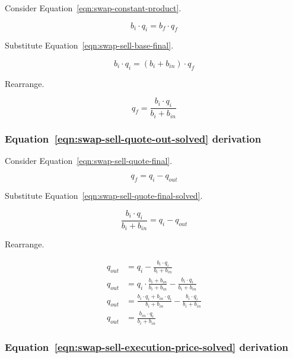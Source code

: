 \documentclass[table, twocolumn]{article}
\begin{document}
Consider Equation~\ref{eqn:swap-constant-product}.

\begin{equation}
	b_i \cdot q_i = b_f \cdot q_f \nonumber
\end{equation}

Substitute Equation~\ref{eqn:swap-sell-base-final}.

\begin{equation}
	b_i \cdot q_i = (b_i + b_{in}) \cdot q_f \nonumber
\end{equation}

Rearrange.

\begin{equation}
	q_f = \frac{b_i \cdot q_i}{b_i + b_{in}} \nonumber
\end{equation}

\subsubsection{Equation~\ref{eqn:swap-sell-quote-out-solved} derivation}%
\label{sssec:equation-eqn-swap-sell-quote-out-solved-derivation}

Consider Equation~\ref{eqn:swap-sell-quote-final}.

\begin{equation}
	q_f = q_i - q_{out} \nonumber
\end{equation}

Substitute Equation~\ref{eqn:swap-sell-quote-final-solved}.

\begin{equation}
	\frac{b_i \cdot q_i}{b_i + b_{in}}= q_i - q_{out} \nonumber
\end{equation}

Rearrange.

\begin{align}
	q_{out} & = q_i - \frac{b_i \cdot q_i}{b_i + b_{in}} \nonumber       \\
	q_{out} & = q_i \cdot \frac{b_i + b_{in}}{b_i + b_{in}} -
	\frac{b_i \cdot q_i}{b_i + b_{in}} \nonumber                         \\
	q_{out} & = \frac{b_i \cdot q_i + b_{in} \cdot q_i }{b_i + b_{in}} -
	\frac{b_i \cdot q_i}{b_i + b_{in}} \nonumber                         \\
	q_{out} & = \frac{b_{in} \cdot q_i }{b_i + b_{in}} \nonumber
\end{align}

\subsubsection{Equation~\ref{eqn:swap-sell-execution-price-solved} derivation}%
\label{sssec:equation-eqn-swap-sell-execution-price-solved-derivation}
\end{document}
